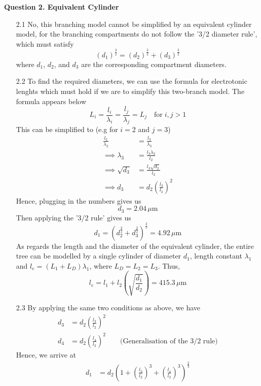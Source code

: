\documentclass[12pt]{article}
\begin{document}
\noindent\textbf{Question 2. Equivalent Cylinder}
\begin{enumerate}
    \item[2.1] No, this branching model cannot be simplified by an equivalent cylinder model, for the branching compartments do not follow the 
    '3/2 diameter rule', which must satisfy 
    $$(d_{1})^{\frac{3}{2}} = (d_{2})^{\frac{3}{2}} + (d_{3})^{\frac{3}{2}}$$
    where $d_{1}$, $d_{2}$, and $d_{3}$ are the corresponding compartment diameters.
    \item[2.2] To find the required diameters, we can use the formula for electrotonic lenghts which must hold if we are to simplify this two-branch model.
    The formula appears below  
    $$L_{i} = \frac{l_{i}}{\lambda_{i}} = \frac{l_{j}}{\lambda_{j}} = L_{j} \quad \text{for} \; i, j > 1$$
    This can be simplified to (e.g for $i=2$ and $j=3$)
    \begin{align*}
        \frac{l_{2}}{\lambda_{2}} &= \frac{l_{3}}{\lambda_{3}}\\
        \implies \lambda_{3} &= \frac{l_{3}\lambda_{2}}{l_{2}}\\
        \implies \sqrt{d_{3}} &= \frac{l_{3}\sqrt{d_{2}}}{l_{2}}\\
        \implies d_{3} &= d_{2}\left(\frac{l_{3}}{l_{2}}\right)^{2}
    \end{align*}
    Hence, plugging in the numbers gives us
    $$d_{3} = 2.04 \, \mu \text{m}$$
    Then applying the '3/2 rule' gives us
    $$d_{1} = (d_{2}^{\frac{3}{2}} + d_{3}^{\frac{3}{2}})^{\frac{2}{3}} = 4.92 \, \mu \text{m}$$
    As regards the length and the diameter of the equivalent cylinder, the entire tree can be modelled by a single cylinder of 
    diameter $d_{1}$, length constant $\lambda_{1}$ and $l_{e} = (L_{1} + L_{D})\lambda_{1}$, where
    $L_{D} = L_{2} = L_{3}$. Thus,
    $$l_{e} = l_{1} + l_{2}\left(\sqrt{\frac{d_{1}}{d_{2}}}\right) = 415.3 \, \mu \text{m}$$
    \item[2.3] By applying the same two conditions as above, we have
    \begin{align*} 
    d_{3} &= d_{2}\left(\frac{l_{3}}{l_{2}}\right)^{2}\\
    d_{4} &= d_{2}\left(\frac{l_{4}}{l_{2}}\right)^{2} \qquad \text{(Generalisation of the 3/2 rule)}
    \end{align*}
    Hence, we arrive at
    \begin{align*}
        d_{1} &= d_{2}\left(1 + \left(\frac{l_{3}}{l_{2}}\right)^{3} + \left(\frac{l_{4}}{l_{2}}\right)^{3}\right)^{\frac{2}{3}}\\

\end{align*}
\end{enumerate}
\end{document}
